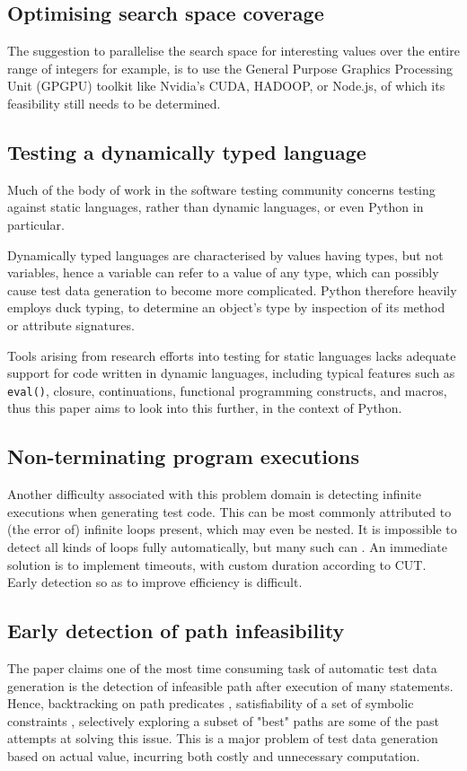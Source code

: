 \documentclass{icldt}
\numberwithin{equation}{section}       %
\begin{document}
\subsection{Optimising search space coverage}
The suggestion to parallelise the search space for interesting values over the entire range of integers for example, is to use the General Purpose Graphics Processing Unit (GPGPU) toolkit like Nvidia's CUDA, HADOOP, or Node.js, of which its feasibility still needs to be determined.
\subsection{Testing a dynamically typed language}
Much of the body of work in the software testing community concerns testing against static languages, rather than dynamic languages, or even Python in particular.

Dynamically typed languages are characterised by values having types, but not variables, hence a variable can refer to a value of any type, which can possibly cause test data generation to become more complicated. Python therefore heavily employs duck typing, to determine an object's type by inspection of its method or attribute signatures.

Tools arising from research efforts into testing for static languages lacks adequate support for code written in dynamic languages, including typical features such as \texttt{eval()}, closure, continuations, functional programming constructs, and macros, thus this paper aims to look into this further, in the context of Python.
\subsection{Non-terminating program executions}
Another difficulty associated with this problem domain is detecting infinite executions when generating test code. This can be most commonly attributed to (the error of) infinite loops present, which may even be nested. It is impossible to detect all kinds of loops fully automatically, but many such can \cite{Tahbildar}. An immediate solution is to implement timeouts, with custom duration according to CUT. Early detection so as to improve efficiency is difficult.
\subsection{Early detection of path infeasibility}
The paper \cite{Tahbildar} claims one of the most time consuming task of automatic test data generation is the detection of infeasible path after execution of many statements. Hence, backtracking on path predicates \cite{Korel1990}, satisfiability of a set of symbolic constraints \cite{ZhangW01}, selectively exploring a subset of "best" paths \cite{Prather1987} are some of the past attempts at solving this issue. This is a major problem of test data generation based on actual value, incurring both costly and unnecessary computation.
\end{document}
